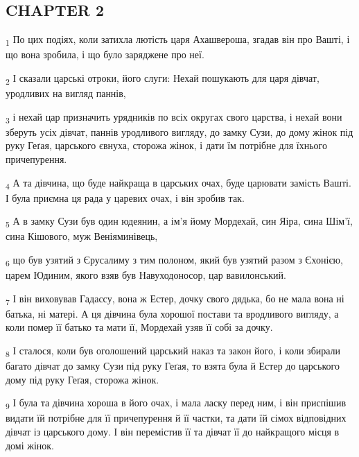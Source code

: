 \subsection{CHAPTER 2}
\begin{tcolorbox}
\textsubscript{1} По цих подіях, коли затихла лютість царя Ахашвероша, згадав він про Вашті, і що вона зробила, і що було заряджене про неї.
\end{tcolorbox}
\begin{tcolorbox}
\textsubscript{2} І сказали царські отроки, його слуги: Нехай пошукають для царя дівчат, уродливих на вигляд паннів,
\end{tcolorbox}
\begin{tcolorbox}
\textsubscript{3} і нехай цар призначить урядників по всіх округах свого царства, і нехай вони зберуть усіх дівчат, паннів уродливого вигляду, до замку Сузи, до дому жінок під руку Геґая, царського євнуха, сторожа жінок, і дати їм потрібне для їхнього причепурення.
\end{tcolorbox}
\begin{tcolorbox}
\textsubscript{4} А та дівчина, що буде найкраща в царських очах, буде царювати замість Вашті. І була приємна ця рада у царевих очах, і він зробив так.
\end{tcolorbox}
\begin{tcolorbox}
\textsubscript{5} А в замку Сузи був один юдеянин, а ім'я йому Мордехай, син Яіра, сина Шім'ї, сина Кішового, муж Веніяминівець,
\end{tcolorbox}
\begin{tcolorbox}
\textsubscript{6} що був узятий з Єрусалиму з тим полоном, який був узятий разом з Єхонією, царем Юдиним, якого взяв був Навуходоносор, цар вавилонський.
\end{tcolorbox}
\begin{tcolorbox}
\textsubscript{7} І він виховував Гадассу, вона ж Естер, дочку свого дядька, бо не мала вона ні батька, ні матері. А ця дівчина була хорошої постави та вродливого вигляду, а коли помер її батько та мати її, Мордехай узяв її собі за дочку.
\end{tcolorbox}
\begin{tcolorbox}
\textsubscript{8} І сталося, коли був оголошений царський наказ та закон його, і коли збирали багато дівчат до замку Сузи під руку Геґая, то взята була й Естер до царського дому під руку Геґая, сторожа жінок.
\end{tcolorbox}
\begin{tcolorbox}
\textsubscript{9} І була та дівчина хороша в його очах, і мала ласку перед ним, і він приспішив видати їй потрібне для її причепурення й її частки, та дати їй сімох відповідних дівчат із царського дому. І він перемістив її та дівчат її до найкращого місця в домі жінок.
\end{tcolorbox}
